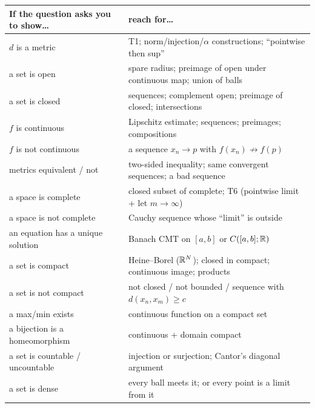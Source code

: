 \begin{center}
\renewcommand{\arraystretch}{1.25}
\begin{longtable}{@{}p{5.6cm}p{10.4cm}@{}}\toprule
If the question asks you to show\dots & reach for\dots\\\midrule
$d$ is a metric & T1; norm/injection/$\alpha$ constructions; ``pointwise then sup''\\
a set is open & spare radius; preimage of open under continuous map; union of balls\\
a set is closed & sequences; complement open; preimage of closed; intersections\\
$f$ is continuous & Lipschitz estimate; sequences; preimages; compositions\\
$f$ is not continuous & a sequence $x_n\to p$ with $f(x_n)\not\to f(p)$\\
metrics equivalent / not & two-sided inequality; same convergent sequences; a bad sequence\\
a space is complete & closed subset of complete; T6 (pointwise limit + let $m\to\infty$)\\
a space is not complete & Cauchy sequence whose ``limit'' is outside\\
an equation has a unique solution & Banach CMT on $[a,b]$ or $C([a,b];\mathbb R)$\\
a set is compact & Heine--Borel ($\mathbb R^N$); closed in compact; continuous image; products\\
a set is not compact & not closed / not bounded / sequence with $d(x_n,x_m)\ge c$\\
a max/min exists & continuous function on a compact set\\
a bijection is a homeomorphism & continuous + domain compact\\
a set is countable / uncountable & injection or surjection; Cantor's diagonal argument\\
a set is dense & every ball meets it; or every point is a limit from it\\\bottomrule
\end{longtable}
\end{center}

